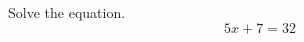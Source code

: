 \begin{question}
\noindent Solve the equation.
\[ 5x + 7 = 32 \]
\vspace{4cm}
\begin{flushright}
\end{flushright}
\end{question}